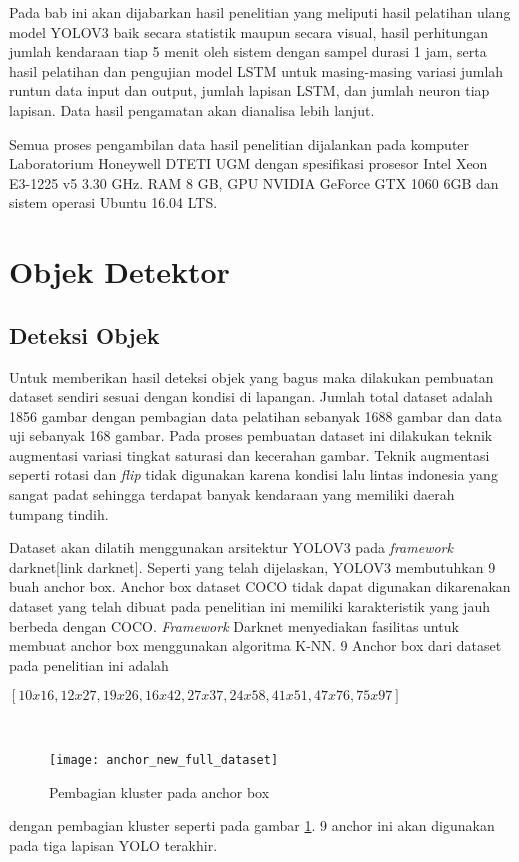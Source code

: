 \documentclass[../thesis.tex]{subfiles}
\begin{document}
Pada bab ini akan dijabarkan hasil penelitian yang meliputi hasil pelatihan ulang model YOLOV3 baik secara statistik maupun secara visual, hasil perhitungan jumlah kendaraan tiap 5 menit oleh sistem dengan sampel durasi 1 jam, serta hasil pelatihan dan pengujian model LSTM untuk masing-masing variasi jumlah runtun data input dan output, jumlah lapisan LSTM, dan jumlah neuron tiap lapisan. Data hasil pengamatan akan dianalisa lebih lanjut.

Semua proses pengambilan data hasil penelitian dijalankan pada komputer Laboratorium Honeywell DTETI UGM dengan spesifikasi prosesor Intel Xeon E3-1225 v5 3.30 GHz.
RAM 8 GB, GPU NVIDIA GeForce GTX 1060 6GB dan sistem operasi Ubuntu 16.04 LTS.

\section{Objek Detektor}
\subsection{Deteksi Objek}
Untuk memberikan hasil deteksi objek yang bagus maka dilakukan pembuatan dataset sendiri sesuai dengan kondisi di lapangan. 
Jumlah total dataset adalah 1856 gambar dengan pembagian data pelatihan sebanyak 1688 gambar dan data uji sebanyak 168 gambar.
Pada proses pembuatan dataset ini dilakukan teknik augmentasi variasi tingkat saturasi dan kecerahan gambar. Teknik augmentasi seperti rotasi dan \textit{flip} tidak digunakan karena kondisi lalu lintas indonesia yang sangat padat sehingga 
terdapat banyak kendaraan yang memiliki daerah tumpang tindih.

Dataset akan dilatih menggunakan arsitektur YOLOV3 pada \textit{framework} darknet[link darknet]. Seperti yang telah dijelaskan, YOLOV3 membutuhkan 
9 buah anchor box. Anchor box dataset COCO tidak dapat digunakan dikarenakan dataset yang telah dibuat pada penelitian ini memiliki karakteristik yang jauh berbeda dengan COCO.
\textit{Framework} Darknet menyediakan fasilitas untuk membuat anchor box menggunakan algoritma K-NN. 9 Anchor box dari dataset pada penelitian ini adalah \\
\centerline{$[10x16, 12x27,  19x26,  16x42,  27x37,  24x58,  41x51, 47x76, 75x97]$}\

\begin{figure}[htp]
	\centering
	\texttt{[image: anchor\_new\_full\_dataset]}
	\caption{Pembagian kluster pada anchor box}
	\label{anchor_dataset}
\end{figure}
dengan pembagian kluster seperti pada gambar \ref{anchor_dataset}. 9 anchor ini akan digunakan pada tiga lapisan YOLO terakhir.
\end{document}
